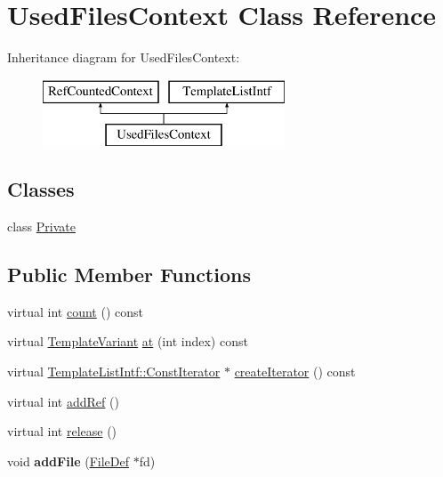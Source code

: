 \hypertarget{class_used_files_context}{}\section{Used\+Files\+Context Class Reference}
\label{class_used_files_context}
Inheritance diagram for Used\+Files\+Context\+:\begin{figure}[H]
\begin{center}
\leavevmode
\includegraphics[height=2.000000cm]{class_used_files_context}
\end{center}
\end{figure}
\subsection*{Classes}
\begin{DoxyCompactItemize}
\item 
class \mbox{\hyperlink{class_used_files_context_1_1_private}{Private}}
\end{DoxyCompactItemize}
\subsection*{Public Member Functions}
\begin{DoxyCompactItemize}
\item 
virtual int \mbox{\hyperlink{class_used_files_context_a36827fc21901f94c4daaffb3fcfd9520}{count}} () const
\item 
virtual \mbox{\hyperlink{class_template_variant}{Template\+Variant}} \mbox{\hyperlink{class_used_files_context_a635972ef6dd5be8afd3b6c069c413dde}{at}} (int index) const
\item 
virtual \mbox{\hyperlink{class_template_list_intf_1_1_const_iterator}{Template\+List\+Intf\+::\+Const\+Iterator}} $\ast$ \mbox{\hyperlink{class_used_files_context_ae9f5d2b5f060ddf612f17054499b8bda}{create\+Iterator}} () const
\item 
virtual int \mbox{\hyperlink{class_used_files_context_a3346f9de5fe74a7c0b962fa546240298}{add\+Ref}} ()
\item 
virtual int \mbox{\hyperlink{class_used_files_context_ad179f197716bee4f11482390962cb180}{release}} ()
\item 
\mbox{\label{class_used_files_context_aa4f8390a396a3c5fffe62a18063506aa}} 
void {\bfseries add\+File} (\mbox{\hyperlink{class_file_def}{File\+Def}} $\ast$fd)
\end{DoxyCompactItemize}
